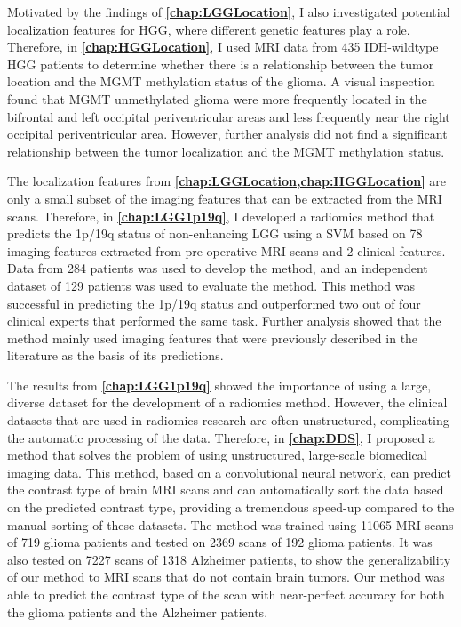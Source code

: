 Motivated by the findings of \textbf{\cref{chap:LGGLocation}}, I also investigated potential localization features for \gls{HGG}, where different genetic features play a role.
Therefore, in \textbf{\cref{chap:HGGLocation}}, I used \gls{MRI} data from 435 \gls{IDH}-wildtype \gls{HGG} patients to determine whether there is a relationship between the \gls{tumor} location and the \gls{MGMT} methylation status of the glioma.
A visual inspection found that \gls{MGMT} unmethylated glioma were more frequently located in the bifrontal and left occipital periventricular areas and less frequently near the right occipital periventricular area.
However, further analysis did not find a significant relationship between the \gls{tumor} localization and the \gls{MGMT} methylation status.

The localization features from \textbf{\cref{chap:LGGLocation,chap:HGGLocation}} are only a small subset of the imaging features that can be extracted from the \gls{MRI} scans.
Therefore, in \textbf{\cref{chap:LGG1p19q}}, I developed a radiomics method that predicts the 1p/19q status of non-enhancing \gls{LGG} using a \gls{SVM} based on 78 imaging features extracted from pre-operative \gls{MRI} scans and 2 clinical features.
Data from 284 patients was used to develop the method, and an independent dataset of 129 patients was used to evaluate the method.
This method was successful in predicting the 1p/19q status and outperformed two out of four clinical experts that performed the same task.
Further analysis showed that the method mainly used imaging features that were previously described in the literature as the basis of its predictions.

The results from \textbf{\cref{chap:LGG1p19q}} showed the importance of using a large, diverse dataset for the development of a radiomics method.
However, the clinical datasets that are used in radiomics research are often unstructured, complicating the automatic processing of the data.
Therefore, in \textbf{\cref{chap:DDS}}, I proposed a method that solves the problem of using unstructured, large-scale biomedical imaging data.
This method, based on a convolutional neural network, can  predict the contrast type of brain \gls{MRI} scans and can automatically sort the data based on the predicted contrast type, providing a tremendous speed-up compared to the manual sorting of these datasets.
The method was trained using 11065 \gls{MRI} scans of 719 glioma patients and tested on 2369 scans of 192 glioma patients.
It was also tested on 7227 scans of 1318 Alzheimer patients, to show the generalizability of our method to \gls{MRI} scans that do not contain brain \glspl{tumor}.
Our method was able to predict the contrast type of the scan with near-perfect accuracy for both the glioma patients and the Alzheimer patients.

